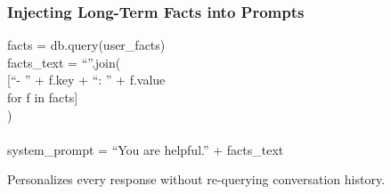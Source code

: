 \documentclass[aspectratio=169,11pt]{beamer}
\begin{document}
\begin{frame}
  \frametitle{Injecting Long-Term Facts into Prompts}
  \begin{codebox}
    \ttfamily\small
    facts = db.query(user\_facts) \\
    facts\_text = ``\n''.join( \\
    \hspace{2em} [``- '' + f.key + ``: '' + f.value \\
    \hspace{4em} for f in facts] \\
    ) \\
    \\
    system\_prompt = ``You are helpful.'' + facts\_text
  \end{codebox}
  \vspace{0.6em}
  \begin{conceptbox}[Effect]
    Personalizes every response without re-querying conversation history.
  \end{conceptbox}
\end{frame}
\end{document}
